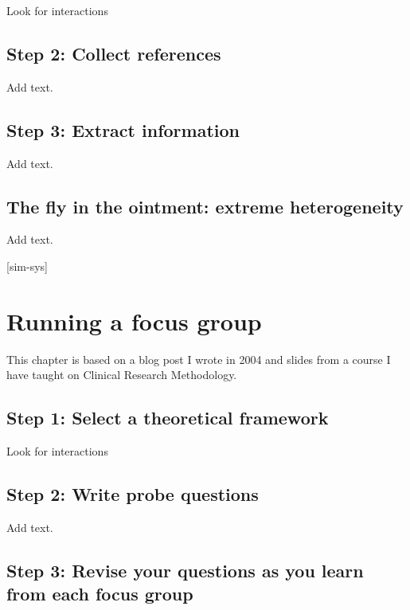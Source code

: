 \documentclass[
  letterpaper,
  DIV=11,
  numbers=noendperiod]{scrreprt}
\begin{document}
Look for interactions

\section{Step 2: Collect references}\label{step-2-collect-references}

Add text.

\section{Step 3: Extract information}\label{step-3-extract-information}

Add text.

\section{The fly in the ointment: extreme
heterogeneity}\label{the-fly-in-the-ointment-extreme-heterogeneity}

Add text.

{[}sim-sys{]}


\chapter{Running a focus group}\label{running-a-focus-group}

This chapter is based on a blog post I wrote in 2004 and slides from a
course I have taught on Clinical Research Methodology.

\section{Step 1: Select a theoretical
framework}\label{step-1-select-a-theoretical-framework}

Look for interactions

\section{Step 2: Write probe
questions}\label{step-2-write-probe-questions}

Add text.

\section{Step 3: Revise your questions as you learn from each focus
group}\label{step-3-revise-your-questions-as-you-learn-from-each-focus-group}
\end{document}
